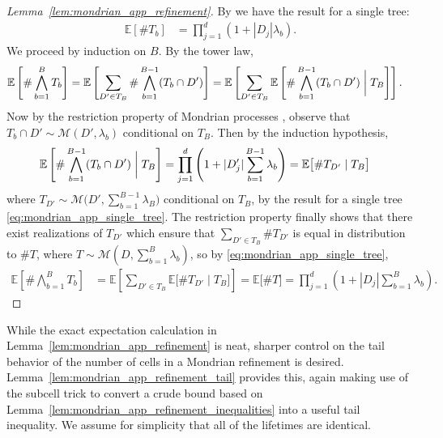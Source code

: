 \documentclass[11pt,lof]{puthesis}
\newcommand{\E}{\ensuremath{\mathbb{E}}}
\newcommand{\cM}{\ensuremath{\mathcal{M}}}
\theoremstyle{break}
\theoremstyle{proof}
\newtheorem{proof}{Proof}
\begin{document}
\begin{proof}[Lemma~\ref{lem:mondrian_app_refinement}]

By \citet[Proposition~2]{mourtada2020minimax}
we have the result for a single tree:
%
\begin{align}
\label{eq:mondrian_app_single_tree}
\E\left[\# T_b \right]
&= \prod_{j=1}^d \left(
1 + |D_j| \lambda_b
\right).
\end{align}
%
We proceed by induction on $B$.
By the tower law,
%
\begin{align*}
\E\left[\# \bigwedge_{b=1}^B T_b \right]
&=
\E\left[
\sum_{D' \in T_B}
\#
\bigwedge_{b=1}^{B-1} (T_b \cap D')
\right]
= \E\left[
\sum_{D' \in T_B}
\E\left[
\#
\bigwedge_{b=1}^{B-1} (T_b \cap D')
\biggm| T_B
\right]
\right].
\end{align*}
%
Now by the restriction property of Mondrian processes
\citep[Fact~2]{mourtada2020minimax},
observe that $T_b \cap D' \sim \cM(D', \lambda_b)$
conditional on $T_B$.
Then by the induction hypothesis,
%
\begin{align*}
\E\left[
\#
\bigwedge_{b=1}^{B-1} (T_b \cap D')
\biggm| T_B
\right]
&=
\prod_{j=1}^d \left(
1 + |D'_j| \sum_{b=1}^{B-1} \lambda_b
\right)
= \E\big[
\# T_{D'} \mid T_B
\big]
\end{align*}
%
where $T_{D'} \sim \cM\big(D', \sum_{b=1}^{B-1} \lambda_B\big)$
conditional on $T_B$,
by the result for a single tree \eqref{eq:mondrian_app_single_tree}.
The restriction property finally shows that there exist realizations
of $T_{D'}$ which ensure that
$\sum_{D' \in T_B} \# T_{D'}$ is equal in distribution
to $\# T$, where $T \sim \cM(D, \sum_{b=1}^B \lambda_b)$,
so by \eqref{eq:mondrian_app_single_tree},
%
\begin{align*}
\E\left[\# \bigwedge_{b=1}^B T_b \right]
&=
\E\left[
\sum_{D' \in T_B}
\E\big[
\# T_{D'} \mid T_B
\big]
\right]
=
\E\big[\# T \big]
= \prod_{j=1}^d \left(
1 + |D_j| \sum_{b=1}^B \lambda_b
\right).
\end{align*}
%
\end{proof}

While the exact expectation calculation in
Lemma~\ref{lem:mondrian_app_refinement} is neat,
sharper control on the tail
behavior of the number of cells in a Mondrian refinement is desired.
Lemma~\ref{lem:mondrian_app_refinement_tail} provides this, again
making use of the subcell trick to convert a crude bound based on
Lemma~\ref{lem:mondrian_app_refinement_inequalities} into a useful tail
inequality.
We assume for simplicity that all of the lifetimes are identical.
\end{document}
